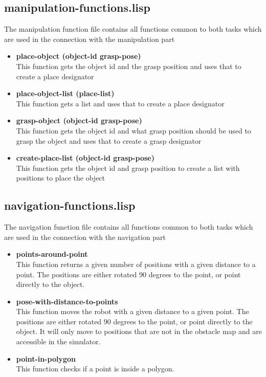 \documentclass[main.tex]{subfiles}
\begin{document}
	    \subsection{manipulation-functions.lisp}
	    \label{manipulation}
	    The manipulation function file contains all functions common to both tasks which are used in the connection with the manipulation part
	    \begin{itemize}
	    \item \textbf{place-object (object-id grasp-pose)} \\
	    This function gets the object id and the grasp position and uses that to create a place designator  
		\item \textbf{place-object-list (place-list)} \\
		This function gets a list and uses that to create a place designator 
	    \item \textbf{grasp-object (object-id grasp-pose)} \\
	    This function gets the object id and what grasp position should be used to grasp the object and uses that to create a grasp designator
	    \item \textbf{create-place-list (object-id grasp-pose)} \\
	    This function gets the object id and grasp position to create a list with positions to place the object
		\end{itemize}
	    \subsection{navigation-functions.lisp}
	    The navigation function file contains all functions common to both tasks which are used in the connection with the navigation part
	    \begin{itemize}
	    	\item \textbf{points-around-point} \\
	    	This function returns a given number of positions with a given 	distance to a point. The positions are either rotated 90 degrees to the point, or point directly to the object.
	    	\item \textbf{pose-with-distance-to-points} \\
	    	This function moves the robot with a given distance to a given point. The positions are either rotated 90 degrees to the point, or point directly to the object. It will only move to positions that are not in the obstacle map and are accessible in the simulator.
	    	\item \textbf{point-in-polygon} \\
			This function checks if a point is inside a polygon.
	    \end{itemize}
\end{document}
